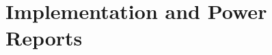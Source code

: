 \documentclass[11pt,a4paper]{article}
\begin{document}








\newpage
\section{Implementation and Power Reports}
\label{section:impl}
\end{document}
